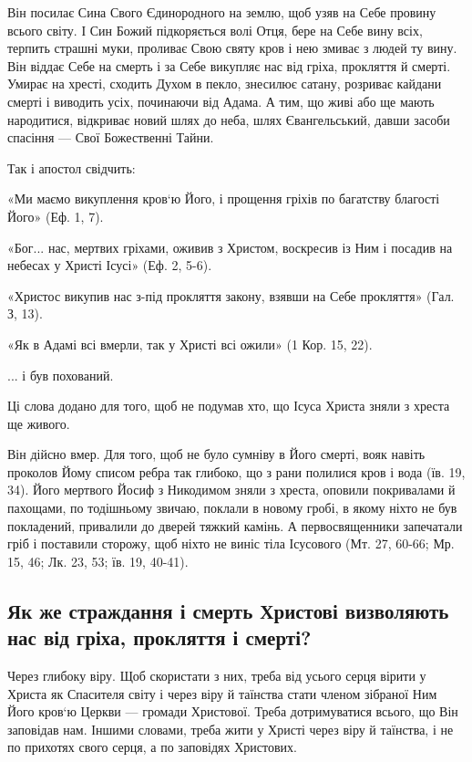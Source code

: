\documentclass[main.tex]{subfiles}
\begin{document}
Він посилає Сина Свого Єдинородного на землю, щоб узяв на Себе провину всього світу. І Син Божий підкоряється волі Отця, бере на Себе вину всіх, терпить страшні муки, проливає Свою святу кров і нею змиває з людей ту вину. Він віддає Себе на смерть і за Себе викупляє нас від гріха, прокляття й смерті. Умирає на хресті, сходить Духом в пекло, знесилює сатану, розриває кайдани смерті і виводить усіх, починаючи від Адама. А тим, що живі або ще мають народитися, відкриває новий шлях до неба, шлях Євангельський, давши засоби спасіння — Свої Божественні Тайни.

Так і апостол свідчить:

«Ми маємо викуплення кров`ю Його, і прощення гріхів по багатству благості Його» (Еф. 1, 7).

«Бог... нас, мертвих гріхами, оживив з Христом, воскресив із Ним і посадив на небесах у Христі Ісусі» (Еф. 2, 5-6).

«Христос викупив нас з-під прокляття закону, взявши на Себе прокляття» (Гал. З, 13).

«Як в Адамі всі вмерли, так у Христі всі ожили» (1 Кор. 15, 22).

... і був похований.

Ці слова додано для того, щоб не подумав хто, що Ісуса Христа зняли з хреста ще живого.

Він дійсно вмер. Для того, щоб не було сумніву в Його смерті, вояк навіть проколов Йому списом ребра так глибоко, що з рани полилися кров і вода (їв. 19, 34). Його мертвого Йосиф з Никодимом зняли з хреста, оповили покривалами й пахощами, по тодішньому звичаю, поклали в новому гробі, в якому ніхто не був покладений, привалили до дверей тяжкий камінь. А первосвященники запечатали гріб і поставили сторожу, щоб ніхто не виніс тіла Ісусового (Мт. 27, 60-66; Мр. 15, 46; Лк. 23, 53; їв. 19, 40-41).

\subsection{Як же страждання і смерть Христові визволяють нас від гріха, прокляття і смерті?}

Через глибоку віру. Щоб скористати з них, треба від усього серця вірити у Христа як Спасителя світу і через віру й таїнства стати членом зібраної Ним Його кров`ю Церкви — громади Христової. Треба дотримуватися всього, що Він заповідав нам. Іншими словами, треба жити у Христі через віру й таїнства, і не по прихотях свого серця, а по заповідях Христових.
\end{document}
